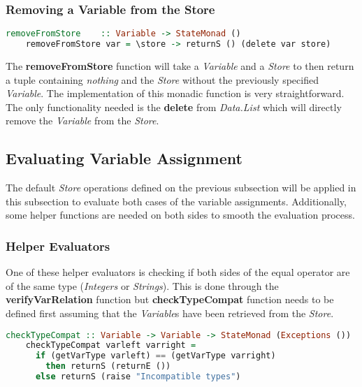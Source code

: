 \documentclass[a4paper, onecolumn]{article}
\begin{document}
    \subsubsection{Removing a Variable from the Store}
    
    \begin{tcolorbox}
    \begin{lstlisting}[language=Haskell] 
    removeFromStore    :: Variable -> StateMonad () 
    removeFromStore var = \store -> returnS () (delete var store) 
    \end{lstlisting}
    \end{tcolorbox}
    
    \noindent The \textbf{removeFromStore} function will take a \textit{Variable} and a \textit{Store} to then return a tuple containing \textit{nothing} and the \textit{Store} without the previously specified \textit{Variable}. The implementation of this monadic function is very straightforward. The only functionality needed is the \textbf{delete} from \textit{Data.List} which will directly remove the \textit{Variable} from the \textit{Store}.  
    
    \subsection{Evaluating Variable Assignment}
    
    The default \textit{Store} operations defined on the previous subsection will be applied in this subsection to evaluate both cases of the variable assignments. Additionally, some helper functions are needed on both sides to smooth the evaluation process. 
    
    \subsubsection{Helper Evaluators}
    
    One of these helper evaluators is checking if both sides of the equal operator are of the same type (\textit{Integers} or \textit{Strings}). This is done through the \textbf{verifyVarRelation} function but \textbf{checkTypeCompat} function needs to be defined first assuming that the \textit{Variable}s have been retrieved from the \textit{Store}. 
    
    \begin{tcolorbox}
    \begin{lstlisting}[language=Haskell] 
    checkTypeCompat :: Variable -> Variable -> StateMonad (Exceptions ())
    checkTypeCompat varleft varright = 
      if (getVarType varleft) == (getVarType varright) 
        then returnS (returnE ())  
      else returnS (raise "Incompatible types")
    \end{lstlisting}
    \end{tcolorbox}
    
\end{document}
